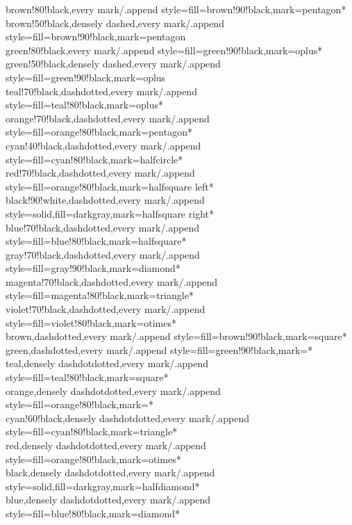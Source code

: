 \documentclass[a4paper]{article}
\begin{document}
{	brown!80!black,every mark/.append style={fill=brown!90!black},mark=pentagon*\\
	brown!50!black,densely dashed,every mark/.append style={fill=brown!90!black},mark=pentagon\\
	green!80!black,every mark/.append style={fill=green!90!black},mark=oplus*\\
	green!50!black,densely dashed,every mark/.append style={fill=green!90!black},mark=oplus\\
	teal!70!black,dashdotted,every mark/.append style={fill=teal!80!black},mark=oplus*\\
	orange!70!black,dashdotted,every mark/.append style={fill=orange!80!black},mark=pentagon*\\
	cyan!40!black,dashdotted,every mark/.append style={fill=cyan!80!black},mark=halfcircle*\\
	red!70!black,dashdotted,every mark/.append style={fill=orange!80!black},mark=halfsquare left*\\
	black!90!white,dashdotted,every mark/.append style={solid,fill=darkgray},mark=halfsquare right*\\
	blue!70!black,dashdotted,every mark/.append style={fill=blue!80!black},mark=halfsquare*\\
	gray!70!black,dashdotted,every mark/.append style={fill=gray!90!black},mark=diamond*\\
	magenta!70!black,dashdotted,every mark/.append style={fill=magenta!80!black},mark=triangle*\\
	violet!70!black,dashdotted,every mark/.append style={fill=violet!80!black},mark=otimes*\\
	brown,dashdotted,every mark/.append style={fill=brown!90!black},mark=square*\\
	green,dashdotted,every mark/.append style={fill=green!90!black},mark=*\\
	teal,densely dashdotdotted,every mark/.append style={fill=teal!80!black},mark=square*\\
	orange,densely dashdotdotted,every mark/.append style={fill=orange!80!black},mark=*\\
	cyan!60!black,densely dashdotdotted,every mark/.append style={fill=cyan!80!black},mark=triangle*\\
	red,densely dashdotdotted,every mark/.append style={fill=orange!80!black},mark=otimes*\\
	black,densely dashdotdotted,every mark/.append style={solid,fill=darkgray},mark=halfdiamond*\\
	blue,densely dashdotdotted,every mark/.append style={fill=blue!80!black},mark=diamond*\\
}
\end{document}
